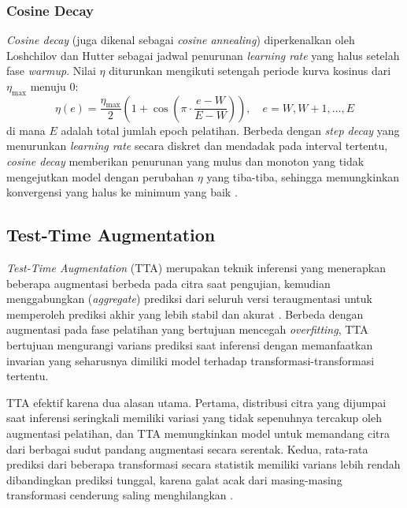 \subsubsection{Cosine Decay}
 
\textit{Cosine decay} (juga dikenal sebagai \textit{cosine annealing}) diperkenalkan oleh Loshchilov dan Hutter \cite{loshchilov2017sgdr} sebagai jadwal penurunan \textit{learning rate} yang halus setelah fase \textit{warmup}. Nilai $\eta$ diturunkan mengikuti setengah periode kurva kosinus dari $\eta_{\max}$ menuju 0:
\begin{equation}
    \eta(e)
    = \frac{\eta_{\max}}{2}
      \left(1 + \cos\!\left(\pi \cdot \frac{e - W}{E - W}\right)\right),
    \quad e = W, W+1, \ldots, E
\end{equation}
di mana $E$ adalah total jumlah epoch pelatihan. Berbeda dengan \textit{step decay} yang menurunkan \textit{learning rate} secara diskret dan mendadak pada interval tertentu, \textit{cosine decay} memberikan penurunan yang mulus dan monoton yang tidak mengejutkan model dengan perubahan $\eta$ yang tiba-tiba, sehingga memungkinkan konvergensi yang halus ke minimum yang baik \cite{loshchilov2017sgdr}.
 
\subsection{Test-Time Augmentation}
\textit{Test-Time Augmentation} (TTA) merupakan teknik inferensi yang menerapkan beberapa augmentasi berbeda pada citra saat pengujian, kemudian menggabungkan (\textit{aggregate}) prediksi dari seluruh versi teraugmentasi untuk memperoleh prediksi akhir yang lebih stabil dan akurat \cite{kim2020testa}. Berbeda dengan augmentasi pada fase pelatihan yang bertujuan mencegah \textit{overfitting}, TTA bertujuan mengurangi varians prediksi saat inferensi dengan memanfaatkan invarian yang seharusnya dimiliki model terhadap transformasi-transformasi tertentu.
 
TTA efektif karena dua alasan utama. Pertama, distribusi citra yang dijumpai saat inferensi seringkali memiliki variasi yang tidak sepenuhnya tercakup oleh augmentasi pelatihan, dan TTA memungkinkan model untuk memandang citra dari berbagai sudut pandang augmentasi secara serentak. Kedua, rata-rata prediksi dari beberapa transformasi secara statistik memiliki varians lebih rendah dibandingkan prediksi tunggal, karena galat acak dari masing-masing transformasi cenderung saling menghilangkan \cite{kim2020testa}.
 
